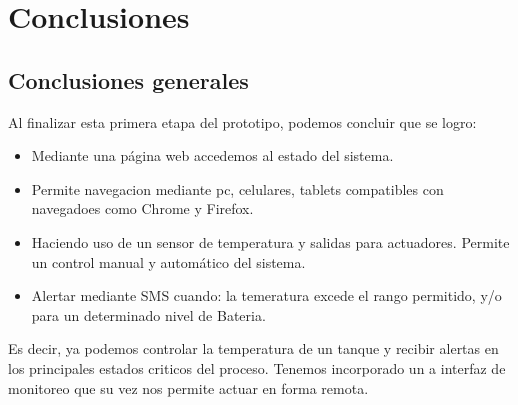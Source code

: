 
\chapter{Conclusiones} %

\label{Chapter5} %




\section{Conclusiones generales }


Al finalizar esta primera etapa del prototipo, podemos concluir que se logro:
  \begin{itemize}
    \item Mediante una página web accedemos al estado del sistema.
    \item Permite navegacion mediante pc, celulares, tablets compatibles con navegadoes como Chrome y Firefox.
    \item Haciendo uso de un sensor de temperatura y salidas para actuadores. Permite un control manual y automático del sistema.
    \item Alertar mediante SMS cuando: la temeratura excede el rango permitido, y/o para un determinado nivel de Bateria.
   \end{itemize} 

Es decir, ya podemos controlar la temperatura de un tanque y recibir alertas en los principales estados criticos del proceso. Tenemos incorporado un a interfaz de monitoreo que su vez nos permite actuar en forma remota. 


